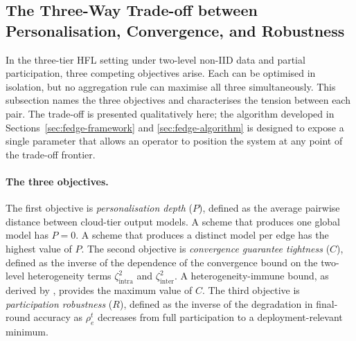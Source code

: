 \subsection{The Three-Way Trade-off between Personalisation, Convergence, and Robustness}
\label{subsec:fedge-tradeoff}

In the three-tier HFL setting under two-level non-IID data and partial participation, three competing objectives arise. Each can be optimised in isolation, but no aggregation rule can maximise all three simultaneously. This subsection names the three objectives and characterises the tension between each pair. The trade-off is presented qualitatively here; the algorithm developed in Sections~\ref{sec:fedge-framework} and \ref{sec:fedge-algorithm} is designed to expose a single parameter that allows an operator to position the system at any point of the trade-off frontier.

\paragraph{The three objectives.}
The first objective is \emph{personalisation depth} ($P$), defined as the average pairwise distance between cloud-tier output models. A scheme that produces one global model has $P = 0$. A scheme that produces a distinct model per edge has the highest value of $P$. The second objective is \emph{convergence guarantee tightness} ($C$), defined as the inverse of the dependence of the convergence bound on the two-level heterogeneity terms $\zeta_{\text{intra}}^{2}$ and $\zeta_{\text{inter}}^{2}$. A heterogeneity-immune bound, as derived by \cite{fang2024hierarchical}, provides the maximum value of $C$. The third objective is \emph{participation robustness} ($R$), defined as the inverse of the degradation in final-round accuracy as $\rho_e^t$ decreases from full participation to a deployment-relevant minimum.

